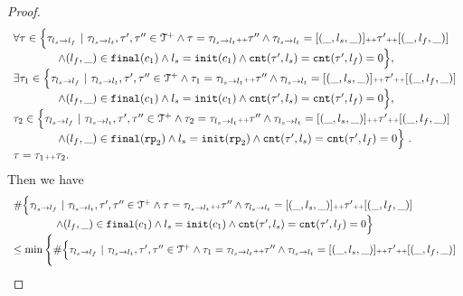 \begin{proof}
\[
  \begin{array}{l}
    \forall \mathtt{\tau} \in
    \Big\{\mathtt{\tau}_{l_s \to l_f} ~\vert~ \mathtt{\tau}_{l_s \to l_t}, \mathtt{\tau}', \mathtt{\tau}''\in \mathcal{T}^{+}
    \land \mathtt{\tau} = \mathtt{\tau}_{l_s \to l_t} {\scriptscriptstyle ++} \mathtt{\tau}''
    \land \mathtt{\tau}_{l_s \to l_t} = [(\_, l_s, \_)] {\scriptscriptstyle ++} \mathtt{\tau}' {\scriptscriptstyle ++} [(\_, l_f, \_)]
    \\ \qquad \qquad
    \land (l_{f}, \_) \in \mathtt{final}(c_1)
    \land l_s = \mathtt{init}(c_1)
    \land \mathtt{cnt}(\mathtt{\tau}', l_s) = \mathtt{cnt}(\mathtt{\tau}', l_f) = 0 
    \Big\},
    \\
    \exists \mathtt{\tau}_1 \in
    \Big\{\mathtt{\tau}_{l_s \to l_f} ~\vert~ \mathtt{\tau}_{l_s \to l_t}, \mathtt{\tau}', \mathtt{\tau}''\in \mathcal{T}^{+}
    \land \mathtt{\tau}_1 = \mathtt{\tau}_{l_s \to l_t} {\scriptscriptstyle ++} \mathtt{\tau}''
    \land \mathtt{\tau}_{l_s \to l_t} = [(\_, l_s, \_)] {\scriptscriptstyle ++} \mathtt{\tau}' {\scriptscriptstyle ++} [(\_, l_f, \_)]
    \\ \qquad \qquad
    \land (l_{f}, \_) \in \mathtt{final}(c_1)
    \land l_s = \mathtt{init}(c_1)
    \land \mathtt{cnt}(\mathtt{\tau}', l_s) = \mathtt{cnt}(\mathtt{\tau}', l_f) = 0 
    \Big\},
    \\
    \mathtt{\tau}_2 \in
    \Big\{\mathtt{\tau}_{l_s \to l_f} ~\vert~ \mathtt{\tau}_{l_s \to l_t}, \mathtt{\tau}', \mathtt{\tau}''\in \mathcal{T}^{+}
    \land \mathtt{\tau}_2 = \mathtt{\tau}_{l_s \to l_t} {\scriptscriptstyle ++} \mathtt{\tau}''
    \land \mathtt{\tau}_{l_s \to l_t} = [(\_, l_s, \_)] {\scriptscriptstyle ++} \mathtt{\tau}' {\scriptscriptstyle ++} [(\_, l_f, \_)]
   \\ \qquad \qquad
   \land (l_{f}, \_) \in \mathtt{final}(\mathtt{rp}_2)
   \land l_s = \mathtt{init}(\mathtt{rp}_2)
   \land \mathtt{cnt}(\mathtt{\tau}', l_s) = \mathtt{cnt}(\mathtt{\tau}', l_f) = 0 
   \Big\} 
   ~.~ 
   \\
   \mathtt{\tau} = \mathtt{\tau}_1 {\scriptscriptstyle ++} \mathtt{\tau}_2.
    \end{array}
  \]
  Then we have
  \[
    \begin{array}{l}
      \# \Big\{\mathtt{\tau}_{l_s \to l_f} ~\vert~ \mathtt{\tau}_{l_s \to l_t}, \mathtt{\tau}', \mathtt{\tau}''\in \mathcal{T}^{+}
      \land \mathtt{\tau} = \mathtt{\tau}_{l_s \to l_t} {\scriptscriptstyle ++} \mathtt{\tau}''
      \land \mathtt{\tau}_{l_s \to l_t} = [(\_, l_s, \_)] {\scriptscriptstyle ++} \mathtt{\tau}' {\scriptscriptstyle ++} [(\_, l_f, \_)]
      \\ \qquad \qquad
      \land (l_{f}, \_) \in \mathtt{final}(c_1)
      \land l_s = \mathtt{init}(c_1)
      \land \mathtt{cnt}(\mathtt{\tau}', l_s) = \mathtt{cnt}(\mathtt{\tau}', l_f) = 0 
      \Big\}
      \\ \leq 
      \min \Bigg\{ \#
      \Big\{\mathtt{\tau}_{l_s \to l_f} ~\vert~ \mathtt{\tau}_{l_s \to l_t}, \mathtt{\tau}', \mathtt{\tau}''\in \mathcal{T}^{+}
      \land \mathtt{\tau}_1 = \mathtt{\tau}_{l_s \to l_t} {\scriptscriptstyle ++} \mathtt{\tau}''
      \land \mathtt{\tau}_{l_s \to l_t} = [(\_, l_s, \_)] {\scriptscriptstyle ++} \mathtt{\tau}' {\scriptscriptstyle ++} [(\_, l_f, \_)]

\end{array}\]
\end{proof}
